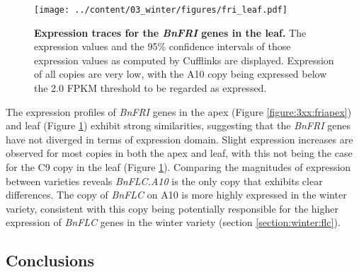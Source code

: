 \documentclass[12pt,]{book}
\begin{document}
\begin{figure}[htbp]
\centering
\texttt{[image: ../content/03\_winter/figures/fri\_leaf.pdf]}
\caption{\textbf{Expression traces for the \emph{BnFRI} genes in the
leaf.} The expression values and the 95\% confidence intervals of those
expression values as computed by Cufflinks are displayed. Expression of
all copies are very low, with the A10 copy being expressed below the 2.0
FPKM threshold to be regarded as expressed.}\label{figure:3xx:frileaf}
\end{figure}

The expression profiles of \emph{BnFRI} genes in the apex (Figure
\ref{figure:3xx:friapex}) and leaf (Figure \ref{figure:3xx:frileaf})
exhibit strong similarities, suggesting that the \emph{BnFRI} genes have
not diverged in terms of expression domain. Slight expression increases
are observed for most copies in both the apex and leaf, with this not
being the case for the C9 copy in the leaf (Figure
\ref{figure:3xx:frileaf}). Comparing the magnitudes of expression
between varieties reveals \emph{BnFLC.A10} is the only copy that
exhibits clear differences. The copy of \emph{BnFLC} on A10 is more
highly expressed in the winter variety, consistent with this copy being
potentially responsible for the higher expression of \emph{BnFLC} genes
in the winter variety (section \ref{section:winter:flc}).

\subsection{Conclusions}\label{conclusions-5}
\end{document}
